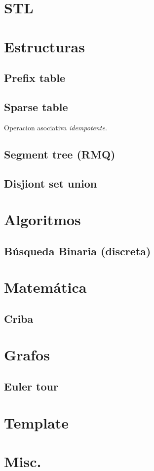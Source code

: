 

\def\title{Notebook (largo)}
\tableofcontents\newpage
 
\section{STL}
    

\section{Estructuras}
    \subsection{Prefix table}
    \subsection{Sparse table}
        Operacion asociativa \emph{idempotente}.
    \subsection{Segment tree (RMQ)}
    \subsection{Disjiont set union}

\section{Algoritmos}
    \subsection{Búsqueda Binaria (discreta)}

\section{Matemática}
    \subsection{Criba}

\section{Grafos}
    \subsection{Euler tour}

\section{Template}

\section{Misc.}
    

